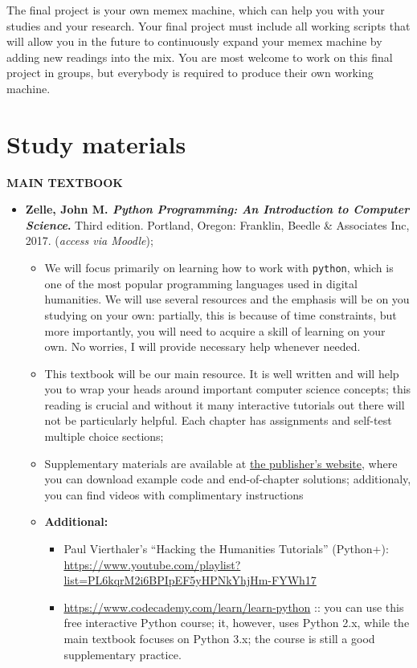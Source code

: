 \documentclass[
]{book}
\providecommand{\tightlist}{%
  \setlength{\itemsep}{0pt}\setlength{\parskip}{0pt}}
\begin{document}
The final project is your own memex machine, which can help you with your studies and your research. Your final project must include all working scripts that will allow you in the future to continuously expand your memex machine by adding new readings into the mix. You are most welcome to work on this final project in groups, but everybody is required to produce their own working machine.

\hypertarget{study-materials}{%
\section*{Study materials}\label{study-materials}}

\textbf{MAIN TEXTBOOK}

\begin{itemize}
\tightlist
\item
  \textbf{Zelle, John M. \emph{Python Programming: An Introduction to Computer Science}.} Third edition. Portland, Oregon: Franklin, Beedle \& Associates Inc, 2017. (\emph{access via Moodle}); \citep{ZellePython2017}

  \begin{itemize}
  \tightlist
  \item
    We will focus primarily on learning how to work with \texttt{python}, which is one of the most popular programming languages used in digital humanities. We will use several resources and the emphasis will be on you studying on your own: partially, this is because of time constraints, but more importantly, you will need to acquire a skill of learning on your own. No worries, I will provide necessary help whenever needed.
  \item
    This textbook will be our main resource. It is well written and will help you to wrap your heads around important computer science concepts; this reading is crucial and without it many interactive tutorials out there will not be particularly helpful. Each chapter has assignments and self-test multiple choice sections;
  \item
    Supplementary materials are available at \href{https://fbeedle.com/our-books/23-python-programming-an-introduction-to-computer-science-3rd-ed-9781590282755.html}{the publisher's website}, where you can download example code and end-of-chapter solutions; additionaly, you can find videos with complimentary instructions
  \item
    \textbf{Additional:}

    \begin{itemize}
    \tightlist
    \item
      Paul Vierthaler's ``Hacking the Humanities Tutorials'' (Python+): \url{https://www.youtube.com/playlist?list=PL6kqrM2i6BPIpEF5yHPNkYhjHm-FYWh17}
    \item
      \url{https://www.codecademy.com/learn/learn-python} :: you can use this free interactive Python course; it, however, uses Python 2.x, while the main textbook focuses on Python 3.x; the course is still a good supplementary practice.
    \end{itemize}
  \end{itemize}
\end{itemize}
\end{document}

